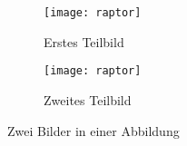 \documentclass{scrartcl}
\begin{document}
\begin{figure}
	\centering
  \begin{subfigure}{.45\textwidth}
 	 \centering
    \texttt{[image: raptor]}
    \caption{Erstes Teilbild}
    \label{fig:raptor1}
  \end{subfigure}
  \begin{subfigure}{.45\textwidth}
	 \centering
    \texttt{[image: raptor]}
    \caption{Zweites Teilbild}
  \end{subfigure}
  \caption{Zwei Bilder in einer Abbildung}
\end{figure}
\end{document}
